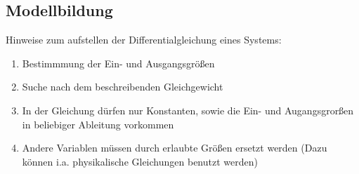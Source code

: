 \documentclass[10pt,a4paper]{article}
\begin{document}
  \subsection{Modellbildung}
  Hinweise zum aufstellen der Differentialgleichung eines Systems:
  \begin{mdframed}[style=exercise]
  \begin{enumerate}
      \item Bestimmmung der Ein- und Ausgangsgrößen
      \item Suche nach dem beschreibenden Gleichgewicht
      \item In der Gleichung dürfen nur Konstanten, sowie die Ein- und
          Augangsgrorßen in beliebiger Ableitung vorkommen
      \item Andere Variablen müssen durch erlaubte Größen ersetzt werden (Dazu
          können i.a. physikalische Gleichungen benutzt werden)
    \end{enumerate}
\end{mdframed}
\end{document}
